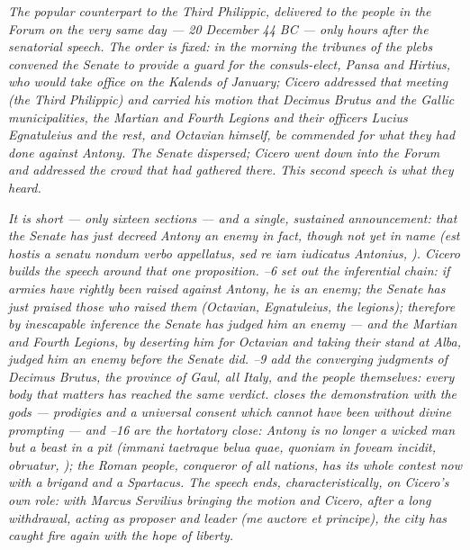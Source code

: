 
\textit{The popular counterpart to the Third Philippic, delivered
to the people in the Forum on the very same day --- 20 December
44 BC --- only hours after the senatorial speech. The order is
fixed: in the morning the tribunes of the plebs convened the
Senate to provide a guard for the consuls-elect, Pansa and
Hirtius, who would take office on the Kalends of January; Cicero
addressed that meeting (the Third Philippic) and carried his
motion that Decimus Brutus and the Gallic municipalities, the
Martian and Fourth Legions and their officers Lucius Egnatuleius
and the rest, and Octavian himself, be commended for what they
had done against Antony. The Senate dispersed; Cicero went down
into the Forum and addressed the crowd that had gathered there.
This second speech is what they heard.}

\textit{It is short --- only sixteen sections --- and a single,
sustained announcement: that the Senate has just decreed Antony
an enemy in fact, though not yet in name (\textit{est hostis a
senatu nondum verbo appellatus, sed re iam iudicatus Antonius},
). Cicero builds the speech around that one
proposition. --6 set out the inferential chain:
if armies have rightly been raised against Antony, he is an
enemy; the Senate has just praised those who raised them
(Octavian, Egnatuleius, the legions); therefore by inescapable
inference the Senate has judged him an enemy --- and the
Martian and Fourth Legions, by deserting him for Octavian and
taking their stand at Alba, judged him an enemy before the
Senate did. --9 add the converging judgments of
Decimus Brutus, the province of Gaul, all Italy, and the people
themselves: every body that matters has reached the same
verdict.  closes the demonstration with the
gods --- prodigies and a universal consent which cannot have
been without divine prompting --- and --16 are
the hortatory close: Antony is no longer a wicked man but a
beast in a pit (\textit{immani taetraque belua quae, quoniam in
foveam incidit, obruatur}, ); the Roman people,
conqueror of all nations, has its whole contest now with a
brigand and a Spartacus. The speech ends, characteristically,
on Cicero's own role: with Marcus Servilius bringing the
motion and Cicero, after a long withdrawal, acting as proposer
and leader (\textit{me auctore et principe}), the city has
caught fire again with the hope of liberty.}

